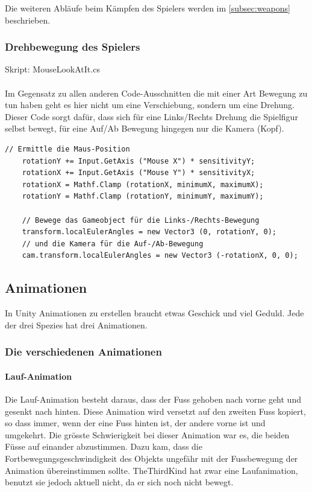 Die weiteren Abläufe beim Kämpfen des Spielers werden im \cref{subsec:weapons} beschrieben.

\subsubsection{Drehbewegung des Spielers}
Skript: MouseLookAtIt.cs\\\\
Im Gegensatz zu allen anderen Code-Ausschnitten die mit einer Art Bewegung zu tun haben geht es hier nicht um eine Verschiebung, sondern um eine Drehung.
Dieser Code sorgt dafür, dass sich für eine Links/Rechts Drehung die Spielfigur selbst bewegt, für eine Auf/Ab Bewegung hingegen nur die Kamera (Kopf).


\begin{lstlisting}[caption={Drehbewegungen}]
	// Ermittle die Maus-Position
	rotationY += Input.GetAxis ("Mouse X") * sensitivityY;
	rotationX += Input.GetAxis ("Mouse Y") * sensitivityX;
	rotationX = Mathf.Clamp (rotationX, minimumX, maximumX);
	rotationY = Mathf.Clamp (rotationY, minimumY, maximumY);
	
	// Bewege das Gameobject für die Links-/Rechts-Bewegung
	transform.localEulerAngles = new Vector3 (0, rotationY, 0);
	// und die Kamera für die Auf-/Ab-Bewegung
	cam.transform.localEulerAngles = new Vector3 (-rotationX, 0, 0);
\end{lstlisting}

\subsection{Animationen}
In Unity Animationen zu erstellen braucht etwas Geschick und viel Geduld. Jede der drei Spezies hat drei Animationen.

\subsubsection{Die verschiedenen Animationen}
\paragraph{Lauf-Animation}

Die Lauf-Animation besteht daraus, dass der Fuss gehoben nach vorne geht und gesenkt nach hinten. Diese Animation wird versetzt auf den zweiten Fuss kopiert, so dass immer, wenn der eine Fuss hinten ist, der andere vorne ist und umgekehrt. Die grösste Schwierigkeit bei dieser Animation war es, die beiden Füsse auf einander abzustimmen. Dazu kam, dass die Fortbewegungsgeschwindigkeit des Objekts ungefähr mit der Fussbewegung der Animation übereinstimmen sollte. TheThirdKind hat zwar eine Laufanimation, benutzt sie jedoch aktuell nicht, da er sich noch nicht bewegt.

